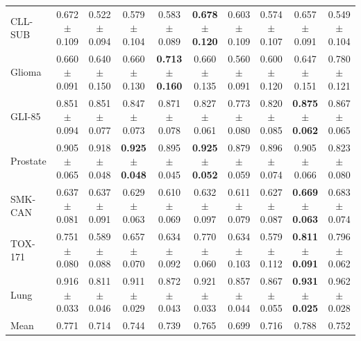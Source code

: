 \begin{table}[!t]
\begin{tabular*}{\textwidth}{@{\extracolsep{\fill}}lccccccccc@{}}
CLL-SUB & 0.672$\pm$0.109 & 0.522$\pm$0.094 & 0.579$\pm$0.104 & 0.583$\pm$0.089 & \textbf{0.678$\pm$0.120} & 0.603$\pm$0.109 & 0.574$\pm$0.107 & 0.657$\pm$0.091 & 0.549$\pm$0.104 \\
Glioma & 0.660$\pm$0.091 & 0.640$\pm$0.150 & 0.660$\pm$0.130 & \textbf{0.713$\pm$0.160} & 0.660$\pm$0.135 & 0.560$\pm$0.091 & 0.600$\pm$0.120 & 0.647$\pm$0.151 & 0.780$\pm$0.121 \\
GLI-85 & 0.851$\pm$0.094 & 0.851$\pm$0.077 & 0.847$\pm$0.073 & 0.871$\pm$0.078 & 0.827$\pm$0.061 & 0.773$\pm$0.080 & 0.820$\pm$0.085 & \textbf{0.875$\pm$0.062} & 0.867$\pm$0.065 \\
Prostate & 0.905$\pm$0.065 & 0.918$\pm$0.048 & \textbf{0.925$\pm$0.048} & 0.895$\pm$0.045 & \textbf{0.925$\pm$0.052} & 0.879$\pm$0.059 & 0.896$\pm$0.074 & 0.905$\pm$0.066 & 0.823$\pm$0.080 \\
SMK-CAN & 0.637$\pm$0.081 & 0.637$\pm$0.091 & 0.629$\pm$0.063 & 0.610$\pm$0.069 & 0.632$\pm$0.097 & 0.611$\pm$0.079 & 0.627$\pm$0.087 & \textbf{0.669$\pm$0.063} & 0.683$\pm$0.074 \\
TOX-171 & 0.751$\pm$0.080 & 0.589$\pm$0.088 & 0.657$\pm$0.070 & 0.634$\pm$0.092 & 0.770$\pm$0.060 & 0.634$\pm$0.103 & 0.579$\pm$0.112 & \textbf{0.811$\pm$0.091} & 0.796$\pm$0.062 \\
Lung & 0.916$\pm$0.033 & 0.811$\pm$0.046 & 0.911$\pm$0.029 & 0.872$\pm$0.043 & 0.921$\pm$0.033 & 0.857$\pm$0.044 & 0.867$\pm$0.055 & \textbf{0.931$\pm$0.025} & 0.962$\pm$0.028 \\
\midrule
Mean & 0.771 & 0.714 & 0.744 & 0.739 & 0.765 & 0.699 & 0.716 & 0.788 & 0.752 \\
\bottomrule
\end{tabular*}
\end{table}
